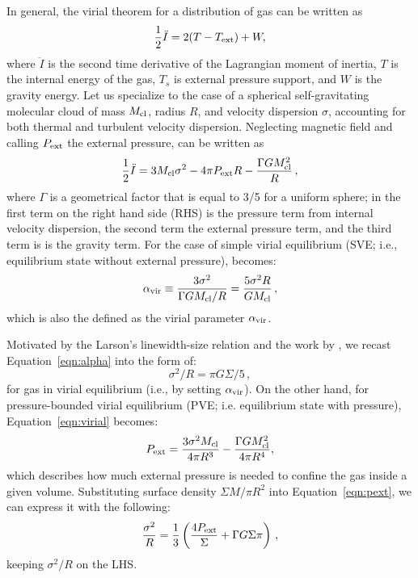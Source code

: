\IfFileExists{emulateapjlegacy.cls}{\documentclass[iop]{emulateapjlegacy}}{\documentclass[iop]{emulateapj}}
\begin{document}
In general, the virial theorem for a distribution of gas can be written as
\begin{equation}\label{eqn:virial_th_general}
\frac{1}{2}\ddot I = 2(T - T_{\rm ext}) + W,
\end{equation}
where $\ddot I$ is the second time derivative of the Lagrangian moment of inertia, $T$ is the internal energy of the gas, $T_s$ is external pressure support, and $W$ is the gravity energy.
%
Let us specialize to the case of a spherical self-gravitating molecular cloud of mass $M_{\rm cl}$, radius $R$, and velocity dispersion $\sigma$, accounting for both thermal and turbulent velocity dispersion. Neglecting magnetic field and calling $P_{\rm ext}$ the external pressure,  can be written as
\begin{equation}
\frac{1}{2}\ddot I = 3 M_{\rm cl} \sigma^2 - 4\pi P_{\rm ext} R - \frac{\Gamma GM_{\rm cl}^2}{R}\,,
\label{eqn:virial}
\end{equation}
where $\Gamma$ is a geometrical factor that is equal to 3/5 for a uniform sphere; in  the first term on the right hand side (RHS) is the pressure term from internal velocity dispersion, the second term the external pressure term, and the third term is is the gravity term. For the case of simple virial equilibrium (SVE; i.e., equilibrium state without external pressure),  becomes:
\begin{equation}
\alpha_{\rm vir} \equiv \frac{3\sigma^2}{\Gamma GM_{\rm cl}/R} = \frac{5\sigma^2R}{GM_{\rm cl}}\,,
\label{eqn:alpha}
\end{equation}
which is also the defined as the virial parameter $\alpha_{\rm vir}$.

Motivated by the Larson's linewidth-size relation \citep{Larson81a} and the work by \citet{Heyer09a}, 
we recast Equation~\ref{eqn:alpha} into the form of:
\begin{equation}
\sigma^2/R = \pi G \Sigma/5\,, 
\label{eqn:SVE}
\end{equation}
for gas in virial equilibrium (i.e., by setting $\alpha_{\rm vir}$).
On the other hand, for pressure-bounded virial equilibrium (PVE; i.e. equilibrium state with pressure), %
Equation~\ref{eqn:virial} becomes:
\begin{equation}
P_{\rm ext} = \frac{3\sigma^2M_{\rm cl}}{4\pi R^3} - \frac{\Gamma G M_{\rm cl}^2}{4\pi R^4},
\label{eqn:pext}
\end{equation}
which describes how much external pressure is needed to confine the gas inside a given volume. 
Substituting surface density $\Sigma$\eq$M/\pi R^2$ into Equation~\ref{eqn:pext}, we can express it with the following:
\begin{equation}
\frac{\sigma^2}{R} = \frac{1}{3}\left(\frac{4P_{\rm ext}}{\Sigma} + \Gamma G \Sigma \pi \right)\,,
\label{eqn:v0}
\end{equation}
keeping $\sigma^2/R$ on the LHS.
\end{document}
